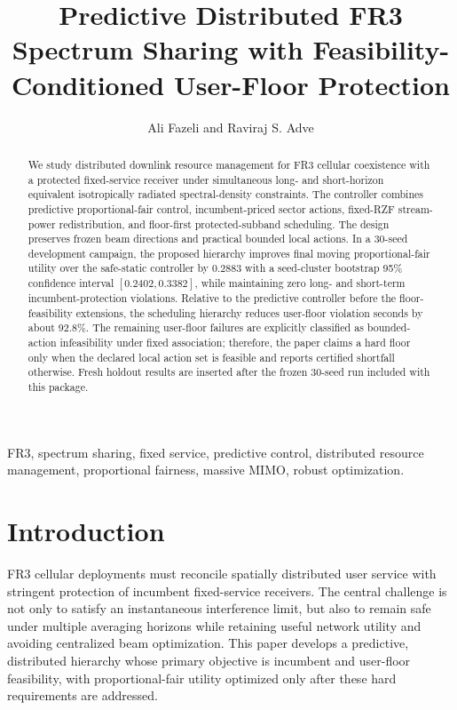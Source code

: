 \documentclass[journal]{IEEEtran}
\title{Predictive Distributed FR3 Spectrum Sharing with Feasibility-Conditioned User-Floor Protection}
\author{Ali Fazeli and Raviraj S. Adve}
\begin{document}
\maketitle
\begin{abstract}
We study distributed downlink resource management for FR3 cellular coexistence with a protected fixed-service receiver under simultaneous long- and short-horizon equivalent isotropically radiated spectral-density constraints. The controller combines predictive proportional-fair control, incumbent-priced sector actions, fixed-RZF stream-power redistribution, and floor-first protected-subband scheduling. The design preserves frozen beam directions and practical bounded local actions. In a 30-seed development campaign, the proposed hierarchy improves final moving proportional-fair utility over the safe-static controller by $0.2883$ with a seed-cluster bootstrap 95\% confidence interval $[0.2402,0.3382]$, while maintaining zero long- and short-term incumbent-protection violations. Relative to the predictive controller before the floor-feasibility extensions, the scheduling hierarchy reduces user-floor violation seconds by about 92.8\%. The remaining user-floor failures are explicitly classified as bounded-action infeasibility under fixed association; therefore, the paper claims a hard floor only when the declared local action set is feasible and reports certified shortfall otherwise. Fresh holdout results are inserted after the frozen 30-seed run included with this package.
\end{abstract}
\begin{IEEEkeywords}
FR3, spectrum sharing, fixed service, predictive control, distributed resource management, proportional fairness, massive MIMO, robust optimization.
\end{IEEEkeywords}

\section{Introduction}
FR3 cellular deployments must reconcile spatially distributed user service with stringent protection of incumbent fixed-service receivers. The central challenge is not only to satisfy an instantaneous interference limit, but also to remain safe under multiple averaging horizons while retaining useful network utility and avoiding centralized beam optimization. This paper develops a predictive, distributed hierarchy whose primary objective is incumbent and user-floor feasibility, with proportional-fair utility optimized only after these hard requirements are addressed.
\end{document}
